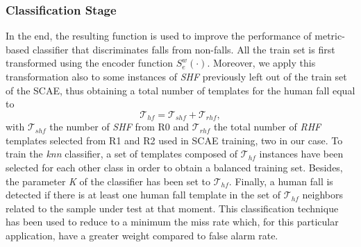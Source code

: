 \subsubsection{Classification Stage}
\label{sec:classification_stage}
In the end, the resulting function is used to improve the performance of metric-based classifier that discriminates falls from non-falls.
All the train set is first transformed using the encoder function $S_e^w(\cdot)$. Moreover, we apply this transformation also to some instances of \textit{SHF} previously left out of the train set of the SCAE, thus obtaining a total number of templates for the human fall equal to 
\begin{equation}
\mathcal{T}_{hf} = \mathcal{T}_{shf} + \mathcal{T}_{rhf},
\end{equation}
with $\mathcal{T}_{shf}$ the number of \textit{SHF} from R0 and $\mathcal{T}_{rhf}$ the total number of \textit{RHF} templates selected from R1 and R2 used in SCAE training, two in our case. To train the \textit{knn} classifier, a set of templates composed of $\mathcal{T}_{hf}$ instances have been selected for each other class in order to obtain a balanced training set. Besides, the parameter \textit{K} of the classifier has been set to $\mathcal{T}_{hf}$. Finally, a human fall is detected if there is at least one human fall template in the set of $\mathcal{T}_{hf}$ neighbors related to the sample under test at that moment. This classification technique has been used to reduce to a minimum the miss rate which, for this particular application, have a greater weight compared to false alarm rate.

